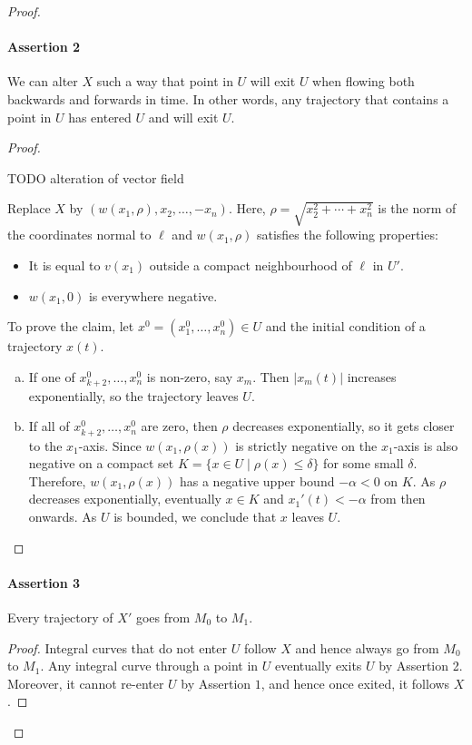 \begin{proof}
\paragraph{Assertion 2}
We can alter $X$ such a way that point in $U$ will exit $U$ when flowing both backwards and forwards in time.
In other words, any trajectory that contains a point in $U$ has entered $U$  and will exit $U$.

\begin{proof}
    \begin{marginfigure}
        \centering
        \caption{TODO alteration of vector field}
        \label{fig:alteration-of-vector-field}
    \end{marginfigure}
    Replace $X$ by  $(w(x_1, \rho), x_2, \ldots, -x_n)$.
    Here, $\rho = \sqrt{x_2^2 + \cdots + x_n^2}$ is the norm of the coordinates normal to $\ell$ and $w(x_1, \rho)$ satisfies the following properties:
    \begin{itemize}
        \item It is equal to $v(x_1)$ outside a compact neighbourhood of  $ \ell$ in $U'$.
        \item $w(x_1, 0)$ is everywhere negative.
    \end{itemize}
    To prove the claim, let $x^0 = (x_1^{0}, \ldots, x_n^{0}) \in U$ and the initial condition of a trajectory $x(t)$.
    \begin{enumerate}[(a)]
        \item If one of $x_{k+2}^{0}, \ldots, x_n^{0}$ is non-zero, say $x_m$. Then $|x_m(t)|$ increases exponentially, so the trajectory leaves $U$.
        \item If all of $x_{k+2}^{0}, \ldots, x_n^{0}$ are zero, then $\rho$ decreases exponentially, so it gets closer to the $x_1$-axis.
            Since $w(x_1, \rho(x))$ is strictly negative on the $ x_1$-axis is also negative on a compact set $K = \{ x \in U  \mid  \rho(x) \le  \delta\} $ for some small $\delta$.
            Therefore, $ w(x_1, \rho(x))$ has a negative upper bound $-\alpha < 0$ on $K$.
            As $\rho$ decreases exponentially, eventually  $x \in K$ and $x_1'(t) < -\alpha$ from then onwards.
            As $U$ is bounded, we conclude that $x$ leaves $U$. \qedhere
    \end{enumerate}
\end{proof}
\paragraph{Assertion 3}
Every trajectory of $X'$ goes from $M_0$ to $M_1$.
\begin{proof}
    Integral curves that do not enter $U$ follow $X$ and hence always go from  $M_0$ to $M_1$.
    Any integral curve through a point in $U$ eventually exits $U$ by Assertion 2. Moreover, it cannot re-enter $U$ by Assertion $1$, and hence once exited, it follows $X$.
\end{proof}


\end{proof}
